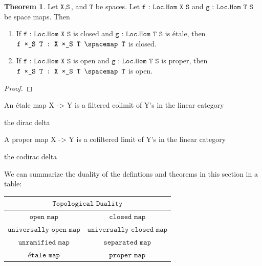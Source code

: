 \documentclass{book}
\theoremstyle{definition}
\newtheorem{theorem}{Theorem}
\begin{document}

\begin{theorem}
Let $\texttt{X}, \texttt{S}$, and $\texttt{T}$ be spaces. Let $\texttt{f : Loc.Hom X S}$ and $\texttt{g : Loc.Hom T S}$ be space maps. Then
\begin{enumerate}
\item If $\texttt{f : Loc.Hom X S}$ is closed and $\texttt{g : Loc.Hom T S}$ is étale, then $\texttt{f ×\_S T : X ×\_S T \spacemap T}$ is closed.
\item If $\texttt{f : Loc.Hom X S}$ is open and $\texttt{g : Loc.Hom T S}$ is proper, then $\texttt{f ×\_S T : X ×\_S T \spacemap T}$ is open.
\end{enumerate} 
\end{theorem}

\begin{proof}

\end{proof}

\begin{proposition}
An étale map X -> Y is a filtered colimit of Y's in the linear category
\end{proposition}

\begin{corollary}
the dirac delta
\end{corollary}

\begin{proposition}
A proper map X -> Y is a cofiltered limit of Y's in the linear category
\end{proposition}

\begin{corollary}
the codirac delta
\end{corollary}
\fi

We can summarize the duality of the defintions and theorems in this section in a table:\\

\begin{center}
\begin{tabular}{ c c }
\multicolumn{2}{c}{$\texttt{Topological \ Duality}$}\\
\hline
$\texttt{open\ map}$ & $\texttt{closed\ map}$  \\ 
$\texttt{universally\ open\ map}$ & $\texttt{universally\ closed\ map}$\\
$\texttt{unramified\ map}$ & $\texttt{separated\ map}$ \\  
$\texttt{étale\ map}$ & $\texttt{proper\ map}$  \\
\hline
\end{tabular}
\end{center}
\end{document}
